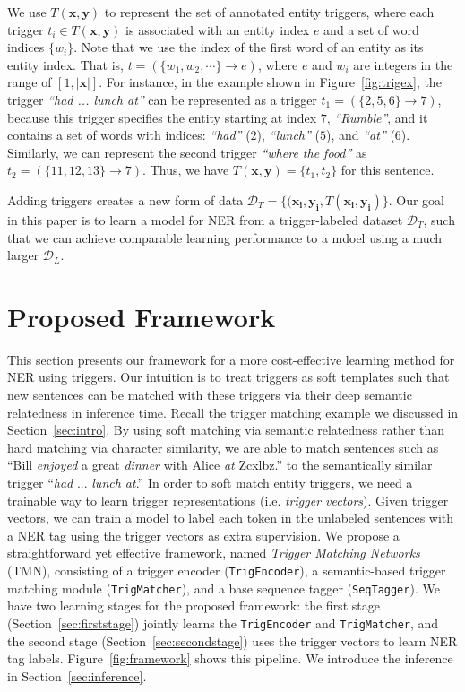 We use $T(\mathbf{x},\mathbf{y})$ to represent the set of annotated entity triggers, where each trigger $t_i\in T(\mathbf{x},\mathbf{y})$ is associated with an entity index $e$ and a set of word indices $\{w_i\}$.
Note that we use the index of the first word of an entity as its entity index.
That is, $t = (\{w_1, w_2, \cdots\}\rightarrow{e})$, where $e$ and $w_i$ are integers in the range of $[1,|\mathbf{x}|]$. \quad
For instance, in the example shown in Figure~\ref{fig:trigex}, the trigger \textit{``had ... lunch at''} can be represented as a trigger $t_1=(\{2,5,6\}\rightarrow{7})$, because this trigger specifies the entity starting at index $7$, \textit{``Rumble''}, and it contains a set of words with indices: \textit{``had''} ($2$), \textit{``lunch''} ($5$), and \textit{``at''} ($6$).
Similarly, we can represent the second trigger \textit{``where the food''} as $t_2 = (\{11,12,13\}\rightarrow{7})$.
Thus, we have $T(\mathbf{x},\mathbf{y})=\{t_1, t_2\}$ for this sentence.

Adding triggers creates a new form of data $\mathcal{D}_{T} = \{(\mathbf{x_i},\mathbf{y_i}, T(\mathbf{x_i},\mathbf{y_i})\}$. 
Our goal in this paper is to learn a model for NER from a trigger-labeled dataset $\mathcal{D}_T$, such that we can achieve comparable learning performance to a mdoel using a much larger $\mathcal{D}_L$.





\section{Proposed Framework}
\label{sec:tmn}
This section presents our framework for a more cost-effective learning method for NER using triggers. Our intuition is to treat triggers as soft templates such that new sentences can be matched with these triggers via their deep semantic relatedness in inference time. Recall the trigger matching example we discussed in Section~\ref{sec:intro}. By using soft matching via semantic relatedness rather than hard matching via character similarity, we are able to match sentences such as ``Bill \textit{enjoyed} a great \textit{dinner} with Alice \textit{at} \underline{Zcxlbz}.'' to the semantically similar trigger ``\textit{had} ... \textit{lunch at}.''
In order to soft match entity triggers, we need a trainable way to learn trigger representations (i.e. \textit{trigger vectors}).
Given trigger vectors, we can train a model to label each token in the unlabeled sentences with a NER tag using the trigger vectors as extra supervision.
We propose a straightforward yet effective framework, named \textit{Trigger Matching Networks} (TMN), consisting of a trigger encoder ({\texttt{TrigEncoder}}), a semantic-based trigger matching module (\texttt{TrigMatcher}), and a base {sequence tagger} (\texttt{SeqTagger}). 
We have two learning stages for the proposed framework: the first stage (Section~\ref{sec:firststage}) jointly learns the \texttt{TrigEncoder} and \texttt{TrigMatcher}, and the second stage (Section~\ref{sec:secondstage}) uses the trigger vectors to learn NER tag labels.
Figure~\ref{fig:framework} shows this pipeline. We introduce the inference in Section~\ref{sec:inference}.




